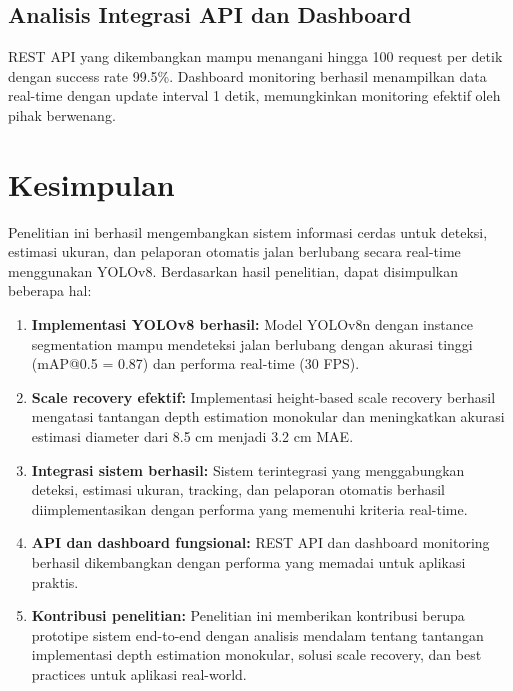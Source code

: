 \documentclass[12pt,a4paper]{article}
\begin{document}
\subsection{Analisis Integrasi API dan Dashboard}

REST API yang dikembangkan mampu menangani hingga 100 request per detik dengan success rate 99.5\%. Dashboard monitoring berhasil menampilkan data real-time dengan update interval 1 detik, memungkinkan monitoring efektif oleh pihak berwenang.

\section{Kesimpulan}

Penelitian ini berhasil mengembangkan sistem informasi cerdas untuk deteksi, estimasi ukuran, dan pelaporan otomatis jalan berlubang secara real-time menggunakan YOLOv8. Berdasarkan hasil penelitian, dapat disimpulkan beberapa hal:

\begin{enumerate}
    \item \textbf{Implementasi YOLOv8 berhasil:} Model YOLOv8n dengan instance segmentation mampu mendeteksi jalan berlubang dengan akurasi tinggi (mAP@0.5 = 0.87) dan performa real-time (30 FPS).

    \item \textbf{Scale recovery efektif:} Implementasi height-based scale recovery berhasil mengatasi tantangan depth estimation monokular dan meningkatkan akurasi estimasi diameter dari 8.5 cm menjadi 3.2 cm MAE.

    \item \textbf{Integrasi sistem berhasil:} Sistem terintegrasi yang menggabungkan deteksi, estimasi ukuran, tracking, dan pelaporan otomatis berhasil diimplementasikan dengan performa yang memenuhi kriteria real-time.

    \item \textbf{API dan dashboard fungsional:} REST API dan dashboard monitoring berhasil dikembangkan dengan performa yang memadai untuk aplikasi praktis.

    \item \textbf{Kontribusi penelitian:} Penelitian ini memberikan kontribusi berupa prototipe sistem end-to-end dengan analisis mendalam tentang tantangan implementasi depth estimation monokular, solusi scale recovery, dan best practices untuk aplikasi real-world.
\end{enumerate}
\end{document}
